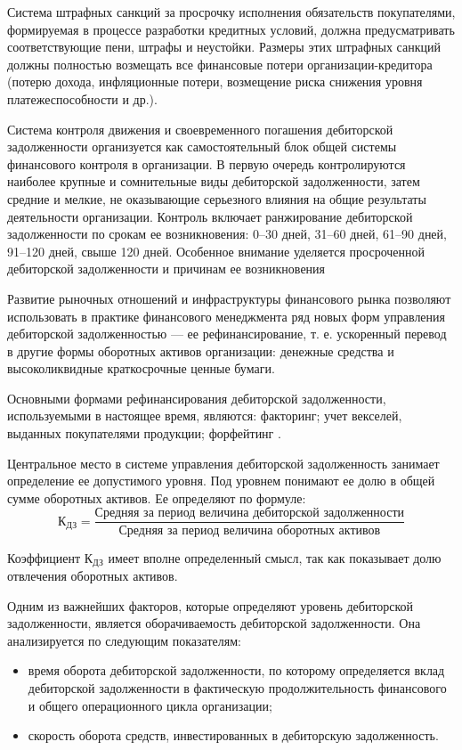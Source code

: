 Система штрафных санкций за просрочку исполнения обязательств покупателями, формируемая в процессе разработки кредитных условий, должна предусматривать соответствующие пени, штрафы и неустойки.
Размеры этих штрафных санкций должны полностью возмещать все финансовые потери организации-кредитора (потерю дохода, инфляционные потери, возмещение риска снижения уровня платежеспособности и др.).

Система контроля движения и своевременного погашения дебиторской задолженности организуется как самостоятельный блок общей системы финансового контроля в организации.
В первую очередь контролируются наиболее крупные и сомнительные виды дебиторской задолженности, затем средние и мелкие, не оказывающие серьезного влияния на общие результаты деятельности организации.
Контроль включает ранжирование дебиторской задолженности по срокам ее возникновения: 0--30 дней, 31--60 дней, 61--90 дней, 91--120 дней, свыше 120 дней.
Особенное внимание уделяется просроченной дебиторской задолженности и причинам ее возникновения

Развитие рыночных отношений и инфраструктуры финансового рынка позволяют использовать в практике финансового менеджмента ряд новых форм управления дебиторской задолженностью --- ее рефинансирование, т. е. ускоренный перевод в другие формы оборотных активов организации: денежные средства и высоколиквидные краткосрочные ценные бумаги.

Основными формами рефинансирования дебиторской задолженности, используемыми в настоящее время, являются: факторинг; учет векселей, выданных покупателями продукции; форфейтинг \cite[361--368]{kirichenko}.

Центральное место в системе управления дебиторской задолженность занимает определение ее допустимого уровня.
Под уровнем понимают ее долю в общей сумме оборотных активов.
Ее определяют по формуле:
 \[ \text{К}_\text{ДЗ} = \dfrac{\text{Средняя за период величина дебиторской задолженности}}{\text{Средняя за период величина оборотных активов}} \] 
 
 Коэффициент $\text{К}_\text{ДЗ}$ имеет вполне определенный смысл, так как показывает долю отвлечения оборотных активов.
 
 Одним из важнейших факторов, которые определяют уровень дебиторской задолженности, является оборачиваемость дебиторской задолженности.
 Она анализируется по следующим показателям:
 \begin{itemize}
 	\item время оборота дебиторской задолженности, по которому определяется вклад дебиторской задолженности в фактическую продолжительность финансового и общего операционного цикла организации;
 	\item скорость оборота средств, инвестированных в дебиторскую задолженность.
 \end{itemize}
 
